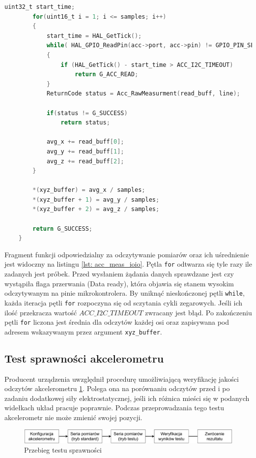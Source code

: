\begin{lstlisting}[language=C,
    caption={Fragment funkcji \texttt{Acc\_AvgMeasurment} odpowiadający za pomiary},
    label={lst: acc_meas_ioio}]
        uint32_t start_time;
        for(uint16_t i = 1; i <= samples; i++)
        {
            start_time = HAL_GetTick();
            while( HAL_GPIO_ReadPin(acc->port, acc->pin) != GPIO_PIN_SET )
            {
                if (HAL_GetTick() - start_time > ACC_I2C_TIMEOUT)
                    return G_ACC_READ;
            }
            ReturnCode status = Acc_RawMeasurment(read_buff, line);
    
            if(status != G_SUCCESS)
                return status;
    
            avg_x += read_buff[0];
            avg_y += read_buff[1];
            avg_z += read_buff[2];
        }
    
        *(xyz_buffer) = avg_x / samples;
        *(xyz_buffer + 1) = avg_y / samples;
        *(xyz_buffer + 2) = avg_z / samples;
    
        return G_SUCCESS;
    }
\end{lstlisting}

Fragment funkcji odpowiedzialny za odczytywanie pomiarów oraz ich uśrednienie jest widoczny na listingu \ref{lst: acc_meas_ioio}. Pętla \texttt{for} odtwarza się tyle razy ile zadanych jest próbek. Przed wysłaniem żądania danych sprawdzane jest czy wystąpiła flaga przerwania (Data ready), która objawia się stanem wysokim odczytywanym na pinie mikrokontrolera. By uniknąć nieskończonej pętli \texttt{while}, każda iteracja pętli \texttt{for} rozpoczyna się od sczytania cykli zegarowych. Jeśli ich ilość przekracza wartość $ACC\_I2C\_TIMEOUT$ zwracany jest błąd. Po zakończeniu pętli \texttt{for} liczona jest średnia dla odczytów każdej osi oraz zapisywana pod adresem wskazywanym przez argument \texttt{xyz\_buffer}.

\subsection{Test sprawności akcelerometru}
Producent urządzenia uwzględnił procedurę umożliwiającą weryfikację jakości odczytów akcelerometru \ref{fig: self-test-diagram}. Polega ona na porównaniu odczytów przed i po zadaniu dodatkowej siły elektrostatycznej, jeśli ich różnica mieści się w podanych widełkach układ pracuje poprawnie. Podczas przeprowadzania tego testu akcelerometr nie może zmienić swojej pozycji. 

\begin{figure}[ht!]
    \centering
    \includegraphics[width=\linewidth]{rysunki/acc/self_test_diagram.pdf}
    \caption{Przebieg testu sprawności}
    \label{fig: self-test-diagram}
\end{figure} 

